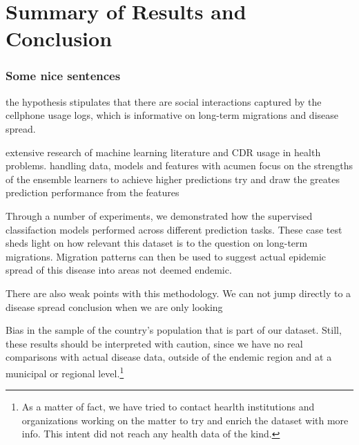 
\chapter{Summary of Results and Conclusion}\label{ch:results_conclusion}




\subsection{Some nice sentences}


the hypothesis stipulates that there are social interactions captured by the cellphone usage logs, which is informative on long-term migrations and disease spread.

extensive research of machine learning literature and CDR usage in health problems.
handling data, models and features with acumen
focus on the strengths of the ensemble learners to achieve higher predictions
try and draw the greates prediction performance from the features

Through a number of experiments, we demonstrated how the supervised classifaction models performed across different prediction tasks.
These case test sheds light on how relevant this dataset is to the question on long-term migrations.
Migration patterns can then be used to suggest actual epidemic spread of this disease into areas not deemed endemic.



There are also weak points with this methodology. We can not jump directly to a disease spread conclusion when we are only looking

Bias in the sample of the country's population that is part of our dataset.
Still, these results should be interpreted with caution, since we have no real comparisons with actual disease data, outside of the endemic region and at a municipal or regional level.\footnote{As a matter of fact, we have tried to contact hearlth institutions and organizations working on the matter to try and enrich the dataset with more info. This intent did not reach any health data of the kind.}


